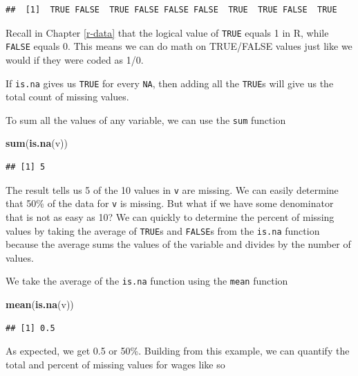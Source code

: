 \documentclass[
]{book}
\newenvironment{Shaded}{\begin{snugshade}}{\end{snugshade}}
\newcommand{\KeywordTok}[1]{\textcolor[rgb]{0.13,0.29,0.53}{\textbf{#1}}}
\newcommand{\NormalTok}[1]{#1}
\newcommand{\OperatorTok}[1]{\textcolor[rgb]{0.81,0.36,0.00}{\textbf{#1}}}
\begin{document}
\begin{verbatim}
##  [1]  TRUE FALSE  TRUE FALSE FALSE FALSE  TRUE  TRUE FALSE  TRUE
\end{verbatim}

Recall in Chapter \ref{r-data} that the logical value of \texttt{TRUE} equals 1 in R, while \texttt{FALSE} equals 0. This means we can do math on TRUE/FALSE values just like we would if they were coded as 1/0.

If \texttt{is.na} gives us \texttt{TRUE} for every \texttt{NA}, then adding all the \texttt{TRUE}s will give us the total count of missing values.

To sum all the values of any variable, we can use the \texttt{sum} function

\begin{Shaded}
\begin{Highlighting}[]
\KeywordTok{sum}\NormalTok{(}\KeywordTok{is.na}\NormalTok{(v))}
\end{Highlighting}
\end{Shaded}

\begin{verbatim}
## [1] 5
\end{verbatim}

The result tells us 5 of the 10 values in \texttt{v} are missing. We can easily determine that 50\% of the data for \texttt{v} is missing. But what if we have some denominator that is not as easy as 10? We can quickly to determine the percent of missing values by taking the average of \texttt{TRUE}s and \texttt{FALSE}s from the \texttt{is.na} function because the average sums the values of the variable and divides by the number of values.

We take the average of the \texttt{is.na} function using the \texttt{mean} function

\begin{Shaded}
\begin{Highlighting}[]
\KeywordTok{mean}\NormalTok{(}\KeywordTok{is.na}\NormalTok{(v))}
\end{Highlighting}
\end{Shaded}

\begin{verbatim}
## [1] 0.5
\end{verbatim}

As expected, we get 0.5 or 50\%. Building from this example, we can quantify the total and percent of missing values for wages like so

\begin{Shaded}
\end{Shaded}
\end{document}
